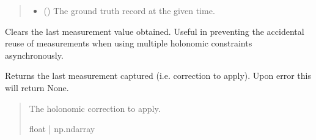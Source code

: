 \documentclass[letterpaper,10pt,english]{sphinxmanual}
\begin{document}
\begin{fulllineitems}
\begin{fulllineitems}
\begin{quote}
\begin{description}
\begin{itemize}
\item {} 
\sphinxAtStartPar
{} ({\hyperref[\detokenize{modules/waypoints/trajectory:qnav.waypoints.trajectory.GroundTruth}]{}}) \textendash{} The ground truth record at the given time.

\end{itemize}

\end{description}\end{quote}

\end{fulllineitems}


\begin{fulllineitems}
\label{\detokenize{modules/simulation/holonomic:qnav.simulation.holonomic.HolonomicConstraint.clear_measurement}}
\pysigstartsignatures
{}
\pysigstopsignatures
\sphinxAtStartPar
Clears the last measurement value obtained.
Useful in preventing the accidental reuse of measurements when using
multiple holonomic constraints asynchronously.

\end{fulllineitems}


\begin{fulllineitems}
\label{\detokenize{modules/simulation/holonomic:qnav.simulation.holonomic.HolonomicConstraint.last_measurement}}
\pysigstartsignatures
{}
\pysigstopsignatures
\sphinxAtStartPar
Returns the last measurement captured (i.e. correction to apply).
Upon error this will return None.
\begin{quote}\begin{description}
\sphinxAtStartPar
The holonomic correction to apply.

\sphinxAtStartPar
float | np.ndarray

\end{description}\end{quote}

\end{fulllineitems}


\end{fulllineitems}
\end{document}
